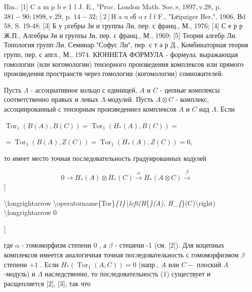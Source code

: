 \documentclass[10pt]{article}
\begin{document}
IIm.: [1] C a m p b e 1 l J. E., "Proc. London Math. Soc.», $1897, \mathrm{v} .28$, p. $381-90 ; 1898, \mathrm{v} .29$, p. $14-32 ;[2] \mathrm{H}$ a u sб o r f f F., "Lеipziger Ber.", 1906, Вd 58, S. 19-48; [3] Б у pгебры Ји и группы Ли, пер. с франц., М., 1976; [4] С е р р Ж.П., Алгебры Ји и группы Ји, пер. с франц., М., 1969; [5] Теория алгебр Ли. Топология групп Ли. Семинар "Софус Ли", пер. с т ә р Д., Комбинаторная теория групп, пер. с апгл., М., 1974. КЮННЕТА ФОРМУЛА - формула, выражающая гомологии (или когомологии) тензорного произведения комплексов или прямого произведения пространств через гомологии (когомологии) сомножителей.



Пусть $\Lambda$ - ассоциативное кольцо с единицей, $A$ и $C$ - цепные комплексы соответственно правых и левых $\Lambda$-модулей. Пусть $A \otimes C$ - комплекс, ассоциированный с тензорным произведениел комплексов $A$ и $C$ над $\Lambda$. Если



$\operatorname{Tor}_{1}(B(A), B(C))=\operatorname{Tor}_{1}\left(H_{*}(A), B(C)\right)=$



$=\operatorname{Tor}_{1}(B(A), Z(C))=\operatorname{Tor}_{1}\left(H_{*}(A), Z(C)\right)=0$,



то имеет место точная последовательность градуированных кодулей



\[

0 \longrightarrow H_{*}(A) \otimes H_{*}(C) \stackrel{\alpha}{\longrightarrow} H_{*}(A \otimes C) \stackrel{\beta}{\longrightarrow}

\][



\textbackslash longrightarrow \textbackslash operatorname\{Tor\}\textit{\{1\}\textbackslash left(H}\{\textit{\}(A), H\_\{}\}(C)\textbackslash right) \textbackslash longrightarrow 0

]



где $\alpha$ - гомоморфизм степени 0 , а $\beta$ - стешени -1 (см. [2]). Для коцепных комплексов имеется аналогичная точная последовательность с гомоморфизмом $\beta$ степени +1 . Если $H_{*}\left(\operatorname{Tor}_{1}(A, C)\right)=0$ (напр., $A$ или $C-$ плоский $\Lambda$-модуль) и $\Lambda$ наследственно, то последовательность (1) существует и расщепляется [2], [3], так что
\end{document}
